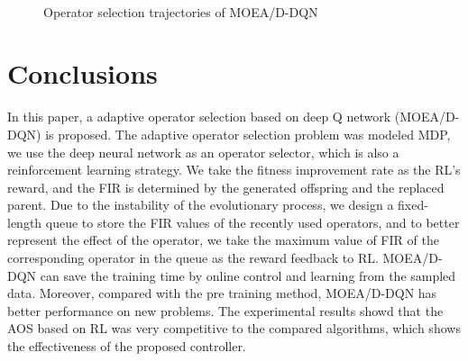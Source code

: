 \documentclass[journal]{IEEEtran}
\begin{document}
\begin{figure}[t]
  \hfil
  \\
  \caption{Operator selection trajectories of MOEA/D-DQN}
  \label{fig:tra}
\end{figure}



\section{Conclusions}
In this paper, a adaptive operator selection based on deep Q network (MOEA/D-DQN) is proposed.
The adaptive operator selection problem was modeled MDP, we use the deep neural network as an operator selector, which is also a reinforcement learning strategy.
We take the fitness improvement rate as the RL's reward, and the FIR is determined by the generated offspring and the replaced parent.
Due to the instability of the evolutionary process, we design a fixed-length queue to store the FIR values of the recently used operators, and to better represent the effect of the operator, we take the maximum value of FIR of the corresponding operator in the queue as the reward feedback to RL.
MOEA/D-DQN can save the training time by online control and learning from the sampled data. Moreover, compared with the pre training method, MOEA/D-DQN has better performance on new problems.
The experimental results showd that the AOS based on RL was very competitive to the compared algorithms, which shows the effectiveness of the proposed controller.
\end{document}
